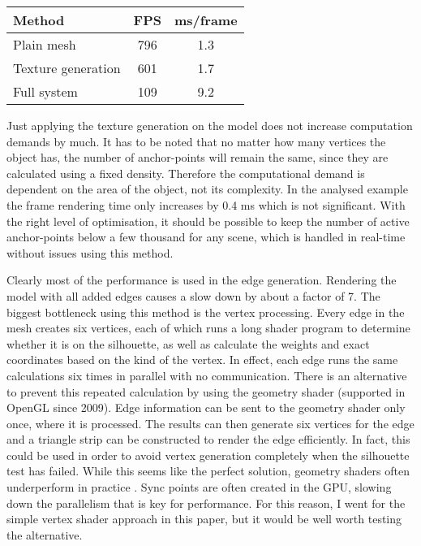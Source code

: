 \documentclass[a4paper,10pt]{article}
\begin{document}
\begin{table}[H]
\centering
\begin{tabular}{|l|c|c|}
\hline
Method             & FPS & ms/frame \\
\hline
Plain mesh         & 796 & 1.3      \\
Texture generation & 601 & 1.7      \\
Full system        & 109 & 9.2      \\
\hline
\end{tabular}
\end{table}

Just applying the texture generation on the model does not increase computation demands by much. It has to be noted that no matter how many vertices the object has, the number of anchor-points will remain the same, since they are calculated using a fixed density. Therefore the computational demand is dependent on the area of the object, not its complexity. In the analysed example the frame rendering time only increases by 0.4 ms which is not significant. With the right level of optimisation, it should be possible to keep the number of active anchor-points below a few thousand for any scene, which is handled in real-time without issues using this method.

Clearly most of the performance is used in the edge generation. Rendering the model with all added edges causes a slow down by about a factor of 7. The biggest bottleneck using this method is the vertex processing. Every edge in the mesh creates six vertices, each of which runs a long shader program to determine whether it is on the silhouette, as well as calculate the weights and exact coordinates based on the kind of the vertex. In effect, each edge runs the same calculations six times in parallel with no communication. There is an alternative to prevent this repeated calculation by using the geometry shader (supported in OpenGL since 2009). Edge information can be sent to the geometry shader only once, where it is processed. The results can then generate six vertices for the edge and a triangle strip can be constructed to render the edge efficiently. In fact, this could be used in order to avoid vertex generation completely when the silhouette test has failed. While this seems like the perfect solution, geometry shaders often underperform in practice \cite{Barczak2015}. Sync points are often created in the GPU, slowing down the parallelism that is key for performance. For this reason, I went for the simple vertex shader approach in this paper, but it would be well worth testing the alternative.
\end{document}
